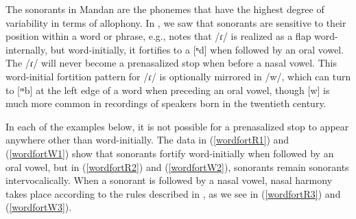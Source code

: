 The sonorants in Mandan are the phonemes that have the highest degree of variability in terms of allophony. In , we saw that sonorants are sensitive to their position within a word or phrase, e.g., \citet{hollow1970} notes that /ɾ/ is realized as a flap word-internally, but word-initially, it fortifies to a [ⁿd] when followed by an oral vowel. The /ɾ/ will never become a prenasalized stop when before a nasal vowel. This word-initial fortition pattern for /ɾ/ is optionally mirrored in /w/, which can turn to [ᵐb] at the left edge of a word when preceding an oral vowel, though [w] is much more common in recordings of speakers born in the twentieth century.

In each of the examples below, it is not possible for a prenasalized stop to appear anywhere other than word-initially. The data in (\ref{wordfortR1}) and (\ref{wordfortW1}) show that sonorants fortify word-initially when followed by an oral vowel, but in (\ref{wordfortR2}) and (\ref{wordfortW2}), sonorants remain sonorants intervocalically. When a sonorant is followed by a nasal vowel, nasal harmony takes place according to the rules described in , as we see in (\ref{wordfortR3}) and (\ref{wordfortW3}).


